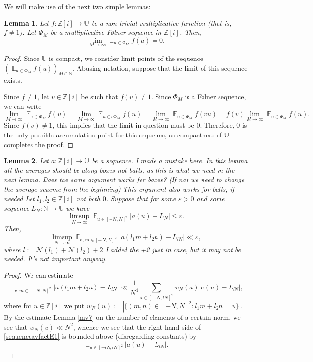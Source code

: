 \documentclass[11pt]{amsart}
\newtheorem{lemma}{Lemma}[section]
\theoremstyle{definition}
\DeclareMathOperator*{\E}{\mathbb{E}}
\newcommand{\N}{{\mathbb N}}
\newcommand{\NN}{{\mathcal N}}
\newcommand{\Z}{{\mathbb Z}}
\newcommand{\U}{{\mathbb U}}
\begin{document}
We will make use of the next two simple lemmas:
\begin{lemma}\label{multav0}
Let $f: \Z[i] \to \U$ be a non-trivial multiplicative function (that is, $f \neq 1$). Let $\Phi_M$ be a multiplicative F\o lner sequence in $\Z[i]$. Then,
\[
\lim_{M \to \infty} \E_{u \in \Phi_M} f(u) = 0.
\]
\end{lemma}
\begin{proof}
Since $\U$ is compact, we consider limit points of the sequence $(\E_{u \in \Phi_M}f(u))_{M \in \N}$. Abusing notation, suppose that the limit of this sequence exists. 

Since $f\neq 1$, let $v \in \Z[i]$ be such that $f(v)\neq 1$. Since $\Phi_M$ is a F\o lner sequence, we can write
\[
\lim_{M \to \infty} \E_{u \in \Phi_M} f(u) = \lim_{M \to \infty} \E_{u \in v\Phi_M} f(u) = \lim_{M \to \infty} \E_{u \in \Phi_M} f(vu) = f(v) \lim_{M \to \infty} \E_{u \in \Phi_M} f(u).
\]
Since $f(v) \neq 1$, this implies that the limit in question must be $0$. Therefore, $0$ is the only possible accumulation point for this sequence, so compactness of $\U$ completes the proof.
\end{proof}
\begin{lemma}\label{sequenceavfact}
Let $a: \Z[i] \to \U$ be a sequence. {\color{red} I made a mistake here. In this lemma all the averages should be along boxes not balls, as this is what we need in the next lemma. Does the same argument works for boxes? (If not we need to change the average scheme from the beginning)} {\color{blue} This argument also works for balls, if needed} Let $l_1, l_2 \in \Z[i]$ not both $0$. Suppose that for some $\varepsilon>0$ and some sequence $L_N: \N \to \U$ we have
\[
\limsup_{N \to \infty} \E_{u \in [-N,N]^2} |a(u)-L_N| \leq \varepsilon.
\]
Then,
\[
\limsup_{N \to \infty} \E_{n, m \in [-N,N]^2} |a(l_1m+l_2n)-L_{lN}| \ll \varepsilon,
\]
where $l:=\NN(l_1)+\NN(l_2)+2$ {\color{blue} I added the +2 just in case, but it may not be needed. It's not important anyway}.
\end{lemma}
\begin{proof}
We can estimate
\begin{equation}\label{sequenceavfactE1}
\E_{n,m \in [-N,N]^2} |a(l_1m+l_2n)-L_{lN}| \ll \frac{1}{N^4}\sum_{u \in [-lN,lN]^2} w_N(u) |a(u)-L_{lN}|,
\end{equation}
where for $u \in \Z[i]$ we put $w_N(u):=|\{(m,n) \in [-N,N]^2 : l_1m+l_2n=u\}|$. By the estimate Lemma \ref{mv7} on the number of elements of a certain norm, we see that $w_N(u) \ll N^2$, whence we see that the right hand side of \ref{sequenceavfactE1} is bounded above (disregarding constants) by
\[
\E_{u \in [-lN, lN]^2} |a(u)-L_{lN}|.
\]
\end{proof}
\end{document}
